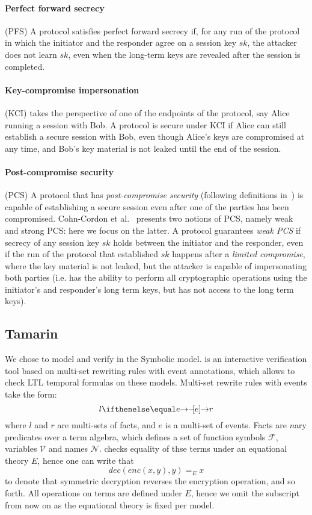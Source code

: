 \paragraph{Perfect forward secrecy} (PFS) A protocol satisfies perfect forward
secrecy if, for any run of the protocol in which the initiator and the responder
agree on a session key $sk$, the attacker does not learn $sk$, even when the
long-term keys are revealed after the session is completed.

\paragraph{Key-compromise impersonation} (KCI) takes the perspective of one
of the endpoints of the protocol, say Alice running a session with Bob. A
protocol is secure under KCI if Alice can still establish a secure session with
Bob, even though Alice's keys are compromised at any time, and Bob's key
material is not leaked until the end of the session.

\paragraph{Post-compromise security} (PCS) A protocol that has
\emph{post-compromise security} (following definitions in~\cite{cohn2016post})
is capable of establishing a secure session even after one of the parties has
been compromised. Cohn-Cordon et al.~\cite{cohn2016post} presents two notions of
PCS, namely weak and strong PCS: here we focus on the latter.
%
A protocol guarantees \emph{weak PCS} if secrecy of any session key $sk$ holds
between the initiator and the responder, even if the run of the protocol that
established $sk$ happens after a \emph{limited compromise}, where the key
material is not leaked, but the attacker is capable of impersonating both
parties (i.e. has the ability to perform all cryptographic operations using the
initiator's and responder's long term keys, but has not access to the long term
keys).

\subsection{Tamarin}
We chose \mTamarin{} to model and verify \mEdhoc{} in the Symbolic model.
%
\mTamarin{} is an interactive verification tool based on multi-set rewriting rules
with event annotations, which allows to check LTL temporal formulas on these
models.
%
Multi-set rewrite rules with events take the form:
%
\[ l \ifarrow[e] r \]
%
where $l$ and $r$ are multi-sets of facts, and $e$ is a multi-set of events.
%
Facts are $n$ary predicates over a term algebra, which defines a set of function
symbols $\mathcal F$, variables $\mathcal V$ and names $\mathcal N$. \mTamarin{}
checks equality of thse terms under an equational theory $E$, hence one can
write that
%
\[ dec(enc(x,y),y) =_E x \]
%
to denote that symmetric decryption reverses the encryption operation, and so
forth. All operations on terms are defined under $E$, hence we omit the
subscript from now on as the equational theory is fixed per model.

